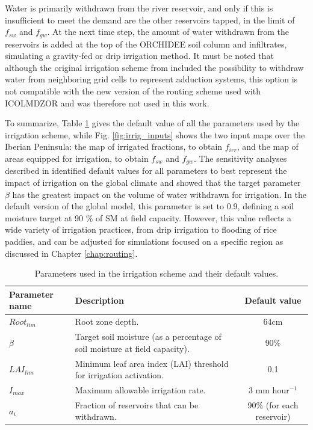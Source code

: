 Water is primarily withdrawn from the river reservoir, and only if this is insufficient to meet the demand are the other reservoirs tapped, in the limit of $f_{sw}$ and $f_{gw}$.
At the next time step, the amount of water withdrawn from the reservoirs is added at the top of the ORCHIDEE soil column and infiltrates, simulating a gravity-fed or drip irrigation method.
It must be noted that although the original irrigation scheme from \citet{arboleda-obando_validation_2024} included the possibility to withdraw water from neighboring grid cells to represent adduction systems, this option is not compatible with the new version of the routing scheme used with ICOLMDZOR and was therefore not used in this work.

To summarize, Table \ref{tab:irrigation_parameters} gives the default value of all the parameters used by the irrigation scheme, while Fig. \ref{fig:irrig_inputs} shows the two input maps over the Iberian Peninsula: the map of irrigated fractions, to obtain $f_{irr}$, and the map of areas equipped for irrigation, to obtain $f_{sw}$ and $f_{gw}$.
The sensitivity analyses described in \citet{arboleda-obando_validation_2024} identified default values for all parameters to best represent the impact of irrigation on the global climate and showed that the target parameter $\beta$ has the greatest impact on the volume of water withdrawn for irrigation.
In the default version of the global model, this parameter is set to 0.9, defining a soil moisture target at 90 \% of SM at field capacity. However, this value reflects a wide variety of irrigation practices, from drip irrigation to flooding of rice paddies, and can be adjusted for simulations focused on a specific region as discussed in Chapter \ref{chap:routing}.

\begin{table}[htbp]
    \centering
    \begin{tabular}{|l|p{7cm}|c|}
        \hline
        \textbf{Parameter name} & \textbf{Description} & \textbf{Default value} \\
        \hline
        $Root_{lim}$ & Root zone depth. & 64cm \\ %
        \hline
        $\beta$ & Target soil moisture (as a percentage of soil moisture at field capacity). & 90\% \\%
        \hline
        $LAI_{lim}$ & Minimum leaf area index (LAI) threshold for irrigation activation. & 0.1 \\ %
        \hline
        $I_{max}$ & Maximum allowable irrigation rate. & 3 mm hour$^{-1}$ \\ %
        \hline
        $a_i$ & Fraction of reservoirs that can be withdrawn. & 90\%  (for each reservoir)\\ %
        \hline
    \end{tabular}
    \caption{Parameters used in the irrigation scheme and their default values.}
    \label{tab:irrigation_parameters}
\end{table}

